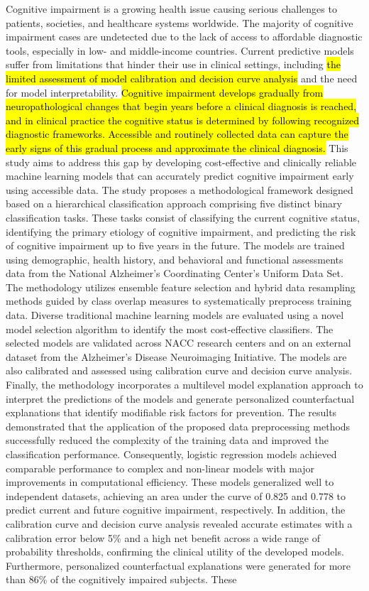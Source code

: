 Cognitive impairment is a growing health issue causing serious challenges to patients, societies, and healthcare systems worldwide. The majority of cognitive impairment cases are undetected due to the lack of access to affordable diagnostic tools, especially in low- and middle-income countries. Current predictive models suffer from limitations that hinder their use in clinical settings, including \hl{the limited assessment of model calibration and decision curve analysis} and the need for model interpretability. \hl{Cognitive impairment develops gradually from neuropathological changes that begin years before a clinical diagnosis is reached, and in clinical practice the cognitive status is determined by following recognized diagnostic frameworks. Accessible and routinely collected data can capture the early signs of this gradual process and approximate the clinical diagnosis.} This study aims to address this gap by developing cost-effective and clinically reliable machine learning models that can accurately predict cognitive impairment early using accessible data. The study proposes a methodological framework designed based on a hierarchical classification approach comprising five distinct binary classification tasks. These tasks consist of classifying the current cognitive status, identifying the primary etiology of cognitive impairment, and predicting the risk of cognitive impairment up to five years in the future. The models are trained using demographic, health history, and behavioral and functional assessments data from the National Alzheimer's Coordinating Center's Uniform Data Set. The methodology utilizes ensemble feature selection and hybrid data resampling methods guided by class overlap measures to systematically preprocess training data. Diverse traditional machine learning models are evaluated using a novel model selection algorithm to identify the most cost-effective classifiers. The selected models are validated across NACC research centers and on an external dataset from the Alzheimer's Disease Neuroimaging Initiative. The models are also calibrated and assessed using calibration curve and decision curve analysis. Finally, the methodology incorporates a multilevel model explanation approach to interpret the predictions of the models and generate personalized counterfactual explanations that identify modifiable risk factors for prevention. The results demonstrated that the application of the proposed data preprocessing methods successfully reduced the complexity of the training data and improved the classification performance. Consequently, logistic regression models achieved comparable performance to complex and non-linear models with major improvements in computational efficiency. These models generalized well to independent datasets, achieving an area under the curve of 0.825 and 0.778 to predict current and future cognitive impairment, respectively. In addition, the calibration curve and decision curve analysis revealed accurate estimates with a calibration error below 5\% and a high net benefit across a wide range of probability thresholds, confirming the clinical utility of the developed models. Furthermore, personalized counterfactual explanations were generated for more than 86\% of the cognitively impaired subjects. These 